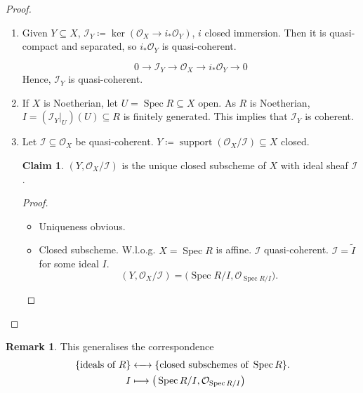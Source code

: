 \documentclass[12pt]{article}
\DeclareMathOperator{\Spec}{Spec}
\DeclareMathOperator{\support}{support}
\theoremstyle{definition}
\newtheorem*{remark}{Remark}
\newtheorem*{claim}{Claim}
\begin{document}
\begin{proof}
\begin{enumerate}[label=\arabic*)]
\item Given $Y\subseteq X$, $\mathcal{I}_Y\coloneqq\ker(\mathcal{O}_X\rightarrow i_*\mathcal{O}_Y)$, $i$ closed immersion. Then it is quasi-compact and separated, so $i_*\mathcal{O}_Y$ is quasi-coherent.

\[0\longrightarrow\mathcal{I}_Y\longrightarrow\mathcal{O}_X\longrightarrow i_*\mathcal{O}_Y\longrightarrow0\]
Hence, $\mathcal{I}_Y$ is quasi-coherent.

\item If $X$ is Noetherian, let $U=\Spec R\subseteq X$ open. As $R$ is Noetherian, $I=(\mathcal{I}_Y|_U)(U)\subseteq R$ is finitely generated. This implies that $\mathcal{I}_Y$ is coherent.

\item Let $\mathcal{I}\subseteq\mathcal{O}_X$ be quasi-coherent. $Y\coloneqq\support(\mathcal{O}_X/\mathcal{I})\subseteq X$ closed.

\begin{claim}
$(Y,\mathcal{O}_X/\mathcal{I})$ is the unique closed subscheme of $X$ with ideal sheaf $\mathcal{I}$.
\end{claim}

\begin{proof}
\begin{itemize}[label=$-$]
\item Uniqueness obvious.

\item Closed subscheme. W.l.o.g. $X=\Spec R$ is affine. $\mathcal{I}$ quasi-coherent. $\mathcal{I}=\widetilde{I}$ for some ideal $I$.
\[(Y,\mathcal{O}_X/\mathcal{I})=\big(\Spec R/I,\mathcal{O}_{\Spec R/I}\big).\]
\end{itemize}
\end{proof}
\end{enumerate}
\end{proof}

\begin{remark}
This generalises the correspondence
\begin{align*}
\{\text{ideals of }R\}&\xleftrightarrow{\hspace{4.4mm}}\{\text{closed subschemes of }\Spec R\}.\\
I&\longmapsto\big(\Spec R/I,\mathcal{O}_{\Spec R/I}\big)
\end{align*}
\end{remark}
\end{document}
